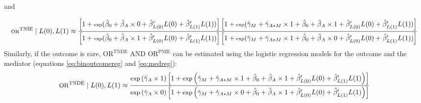 \documentclass[
]{book}
\begin{document}
and

\[ \scriptsize \text{OR}^\text{TNIE} \mid L(0), L(1) \approx \frac{\left[1 + \text{exp}(\hat{\beta}_0 + \hat{\beta}_A \times 0 + \hat{\beta}_{L(0)}^\prime L(0) + \hat{\beta}_{L(1)}^\prime L(1)) \right]  \left[ 1 + \text{exp}(\hat{\gamma}_M + \hat{\gamma}_{A \ast M} \times 1 + \hat{\beta}_0  + \hat{\beta}_A \times 1 + \hat{\beta}_{L(0)}^\prime L(0) + \hat{\beta}_{L(1)}^\prime L(1))\right]}{ \left[1 + \text{exp}(\hat{\beta}_0  + \hat{\beta}_A \times 1 + \hat{\beta}_{L(0)}^\prime L(0) + \hat{\beta}_{L(1)}^\prime L(1)) \right]  \left[ 1 + \text{exp}(\hat{\gamma}_M + \hat{\gamma}_{A \ast M} \times 1 + \hat{\beta}_0 + \hat{\beta}_A \times 0 + \hat{\beta}_{L(0)}^\prime L(0) + \hat{\beta}_{L(1)}^\prime L(1))\right]} \]
Similarly, if the outcome is rare, \(\text{OR}^{\text{TNDE}}\) AND \(\text{OR}^{\text{PNIE}}\) can be estimated using the logistic regression models for the outcome and the mediator (equations \eqref{eq:binoutcomereg} and \eqref{eq:medreg}):
\[\small \text{OR}^\text{TNDE} \mid L(0), L(1) \approx \frac{\text{exp}\left(\hat{\gamma}_A \times 1 \right)  \left[ 1 + \text{exp}\left(\hat{\gamma}_M + \hat{\gamma}_{A \ast M} \times 1 + \hat{\beta}_0 + \hat{\beta}_A \times 1 + \hat{\beta}_{L(0)}^\prime L(0) + \hat{\beta}_{L(1)}^\prime L(1)\right)\right]}{ \text{exp}\left(\hat{\gamma}_A \times 0 \right) \left[ 1 + \text{exp}\left(\hat{\gamma}_M + \hat{\gamma}_{A \ast M} \times 0 + \hat{\beta}_0 + \hat{\beta}_A \times 1 + \hat{\beta}_{L(0)}^\prime L(0) + \hat{\beta}_{L(1)}^\prime L(1)\right)\right]}\]
\end{document}
